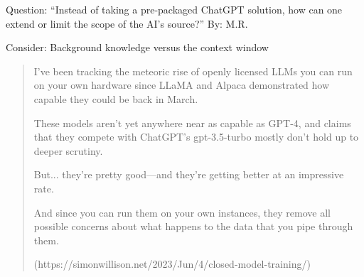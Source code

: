 \documentclass[aspectratio=169]{beamer}
\begin{document}
\begin{frame}{Question: ``Instead of taking a pre-packaged ChatGPT solution, how can one extend or limit the scope of the AI's source?'' By: M.R.
}

Consider: Background knowledge versus the context window        

\begin{quote}
I’ve been tracking the meteoric rise of openly licensed LLMs you can run on your own hardware since LLaMA and Alpaca demonstrated how capable they could be back in March.

These models aren’t yet anywhere near as capable as GPT-4, and claims that they compete with ChatGPT’s gpt-3.5-turbo mostly don’t hold up to deeper scrutiny.

But... they’re pretty good—and they’re getting better at an impressive rate.

And since you can run them on your own instances, they remove all possible concerns about what happens to the data that you pipe through them.

(https://simonwillison.net/2023/Jun/4/closed-model-training/)
        \end{quote}
\end{frame}
\end{document}
